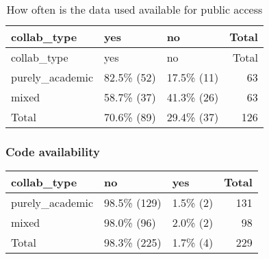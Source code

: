 \documentclass[
]{article}
\begin{document}
\begin{longtable}[]{@{}lllr@{}}
\caption{How often is the data used available for public
access}\tabularnewline
\toprule
collab\_type & yes & no & Total \\
\midrule
\endfirsthead
\toprule
collab\_type & yes & no & Total \\
\midrule
\endhead
purely\_academic & 82.5\% (52) & 17.5\% (11) & 63 \\
mixed & 58.7\% (37) & 41.3\% (26) & 63 \\
Total & 70.6\% (89) & 29.4\% (37) & 126 \\
\bottomrule
\end{longtable}

\hypertarget{code-availability}{%
\subsubsection{Code availability}\label{code-availability}}

\begin{longtable}[]{@{}lllr@{}}
\toprule
collab\_type & no & yes & Total \\
\midrule
\endhead
purely\_academic & 98.5\% (129) & 1.5\% (2) & 131 \\
mixed & 98.0\% (96) & 2.0\% (2) & 98 \\
Total & 98.3\% (225) & 1.7\% (4) & 229 \\
\bottomrule
\end{longtable}
\end{document}
